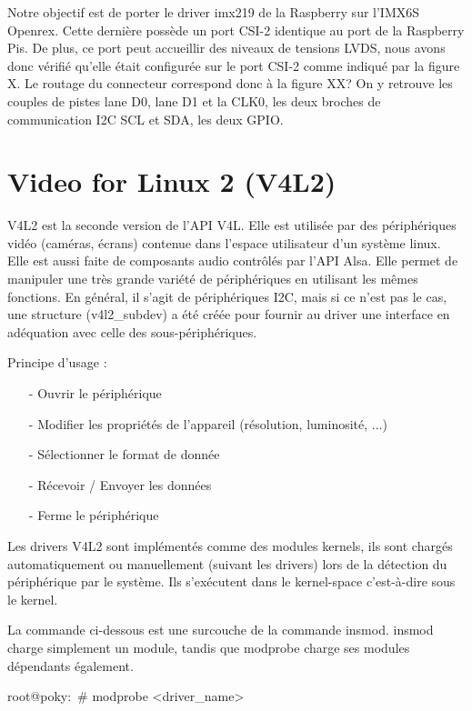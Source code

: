 Notre objectif est de porter le driver imx219 de la Raspberry sur l’IMX6S Openrex. Cette
dernière possède un port CSI-2 identique au port de la Raspberry Pis. De plus, ce port peut accueillir des niveaux de tensions LVDS, nous avons donc vérifié qu’elle était
configurée sur le port CSI-2 comme indiqué par la figure X. Le routage du connecteur
correspond donc à la figure XX? On y retrouve les couples de pistes lane D0, lane D1 et la 
CLK0, les deux broches de communication I2C SCL et SDA, les deux GPIO.

\section{Video for Linux 2 (V4L2)}

V4L2 est la seconde version de l’API V4L. Elle est utilisée par des périphériques vidéo
(caméras, écrans) contenue dans l’espace utilisateur d’un système linux. Elle est aussi
faite de composants audio contrôlés par l’API Alsa. Elle permet de manipuler une très
grande variété de périphériques en utilisant les mêmes fonctions. En général, il s’agit de
périphériques I2C, mais si ce n’est pas le cas, une structure (v4l2\_subdev) a été créée
pour fournir au driver une interface en adéquation avec celle des sous-périphériques.

Principe d'usage :

\begin{itemize}
    \item[-] Ouvrir le périphérique
    \item[-] Modifier les propriétés de l'appareil (résolution, luminosité, ...)
    \item[-] Sélectionner le format de donnée
    \item[-] Récevoir / Envoyer les données
    \item[-] Ferme le périphérique
\end{itemize}

Les drivers V4L2 sont implémentés comme des modules kernels, ils sont chargés
automatiquement ou manuellement (suivant les drivers) lors de la détection du
périphérique par le système. Ils s’exécutent dans le kernel-space c’est-à-dire sous le
kernel.

La commande ci-dessous est une surcouche de la commande insmod. insmod charge
simplement un module, tandis que modprobe charge ses modules dépendants également.

\begin{tcolorbox}
    root@poky:~\# modprobe <driver\_name>
\end{tcolorbox}

